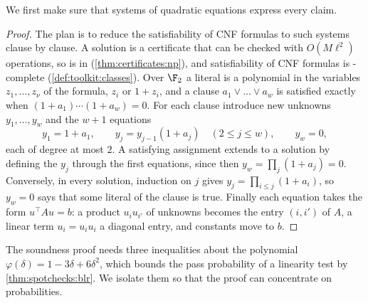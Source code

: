\begin{refsection}
We first make sure that systems of quadratic equations express every  claim.


\begin{proof}
The plan is to reduce the satisfiability of CNF formulas to such systems clause by clause. A solution is a certificate that can be checked with $O(M\ell^2)$ operations, so \spotchecksquadeq{} is in  (\cref{thm:certificates:np}), and satisfiability of CNF formulas is -complete (\cref{def:toolkit:classes}). Over $\F_2$ a literal is a polynomial in the variables $z_1,\dots,z_\nu$ of the formula, $z_i$ or $1+z_i$, and a clause $a_1\vee\dots\vee a_w$ is satisfied exactly when $(1+a_1)\cdots(1+a_w)=0$. For each clause introduce new unknowns $y_1,\dots,y_w$ and the $w+1$ equations
\[
  y_1=1+a_1,\qquad y_j=y_{j-1}(1+a_j)\quad(2\le j\le w),\qquad y_w=0,
\]
each of degree at most $2$. A satisfying assignment extends to a solution by defining the $y_j$ through the first equations, since then $y_w=\prod_j(1+a_j)=0$. Conversely, in every solution, induction on $j$ gives $y_j=\prod_{i\le j}(1+a_i)$, so $y_w=0$ says that some literal of the clause is true. Finally each equation takes the form $u^\top Au=b$: a product $u_iu_{i'}$ of unknowns becomes the entry $(i,i')$ of $A$, a linear term $u_i=u_iu_i$ a diagonal entry, and constants move to $b$.
\end{proof}

The soundness proof needs three inequalities about the polynomial $\varphi(\delta)=1-3\delta+6\delta^2$, which bounds the pass probability of a linearity test by \cref{thm:spotchecks:blr}. We isolate them so that the proof can concentrate on probabilities.



\end{refsection}
